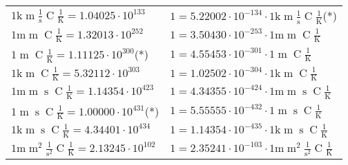 \begin{center}
\begin{longtable}{l l}
{\color{gray}$1 \bm{\mathrm{ k}}{\operatorname{m}}\frac1{\operatorname{s}}{\operatorname{C}}\frac1{\operatorname{K}} = 1.04025\cdot10^{133} $}   & {\color{gray}$ 1 = 5.22002\cdot10^{-134} \cdot 1 \bm{\mathrm{ k}}{\operatorname{m}}\frac1{\operatorname{s}}{\operatorname{C}}\frac1{\operatorname{K}}$}\quad(*)\\
{\color{gray}$1 \bm{\mathrm{ m}}{\operatorname{m}}{}{\operatorname{C}}\frac1{\operatorname{K}} = 1.32013\cdot10^{252} $}   & {\color{gray}$ 1 = 3.50430\cdot10^{-253} \cdot 1 \bm{\mathrm{ m}}{\operatorname{m}}{}{\operatorname{C}}\frac1{\operatorname{K}}$}  \\
{\color{black}$1 \bm{\mathrm{ }}{\operatorname{m}}{}{\operatorname{C}}\frac1{\operatorname{K}} = 1.11125\cdot10^{300} $}\quad(*) & {\color{black}$ 1 = 4.55453\cdot10^{-301} \cdot 1 \bm{\mathrm{ }}{\operatorname{m}}{}{\operatorname{C}}\frac1{\operatorname{K}}$}  \\
{\color{gray}$1 \bm{\mathrm{ k}}{\operatorname{m}}{}{\operatorname{C}}\frac1{\operatorname{K}} = 5.32112\cdot10^{303} $}   & {\color{gray}$ 1 = 1.02502\cdot10^{-304} \cdot 1 \bm{\mathrm{ k}}{\operatorname{m}}{}{\operatorname{C}}\frac1{\operatorname{K}}$}  \\
{\color{gray}$1 \bm{\mathrm{ m}}{\operatorname{m}}{\operatorname{s}}{\operatorname{C}}\frac1{\operatorname{K}} = 1.14354\cdot10^{423} $}   & {\color{gray}$ 1 = 4.34355\cdot10^{-424} \cdot 1 \bm{\mathrm{ m}}{\operatorname{m}}{\operatorname{s}}{\operatorname{C}}\frac1{\operatorname{K}}$}  \\
{\color{black}$1 \bm{\mathrm{ }}{\operatorname{m}}{\operatorname{s}}{\operatorname{C}}\frac1{\operatorname{K}} = 1.00000\cdot10^{431} $}\quad(*) & {\color{black}$ 1 = 5.55555\cdot10^{-432} \cdot 1 \bm{\mathrm{ }}{\operatorname{m}}{\operatorname{s}}{\operatorname{C}}\frac1{\operatorname{K}}$}  \\
{\color{gray}$1 \bm{\mathrm{ k}}{\operatorname{m}}{\operatorname{s}}{\operatorname{C}}\frac1{\operatorname{K}} = 4.34401\cdot10^{434} $}   & {\color{gray}$ 1 = 1.14354\cdot10^{-435} \cdot 1 \bm{\mathrm{ k}}{\operatorname{m}}{\operatorname{s}}{\operatorname{C}}\frac1{\operatorname{K}}$}  \\
{\color{gray}$1 \bm{\mathrm{ m}}{\operatorname{m}^2}\frac1{\operatorname{s}^2}{\operatorname{C}}\frac1{\operatorname{K}} = 2.13245\cdot10^{102} $}   & {\color{gray}$ 1 = 2.35241\cdot10^{-103} \cdot 1 \bm{\mathrm{ m}}{\operatorname{m}^2}\frac1{\operatorname{s}^2}{\operatorname{C}}\frac1{\operatorname{K}}$}  \\

\end{longtable}
\end{center}
